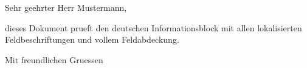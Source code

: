 \documentclass[basic, infoblock, lang=german]{../../onlinebrief24}
\begin{document}
\begin{letter}{}
\opening{Sehr geehrter Herr Mustermann,}

dieses Dokument prueft den deutschen Informationsblock mit allen
lokalisierten Feldbeschriftungen und vollem Feldabdeckung.

\closing{Mit freundlichen Gruessen}
\end{letter}
\end{document}
